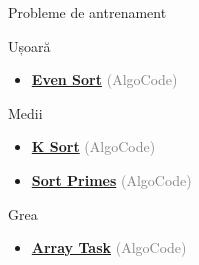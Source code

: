﻿\documentclass{beamer}
\begin{document}
\begin{frame}{Probleme de antrenament}
  \begin{block}{Ușoară}
    \begin{itemize}
      \item \href{https://code.algolymp.com/problems/1081}{\textbf{Even Sort}} {\footnotesize\textcolor{gray}{(AlgoCode)}}
    \end{itemize}
  \end{block}
  \begin{block}{Medii}
    \begin{itemize}
      \item \href{https://code.algolymp.com/problems/1077}{\textbf{K Sort}} {\footnotesize\textcolor{gray}{(AlgoCode)}}
      \item \href{https://code.algolymp.com/problems/1076}{\textbf{Sort Primes}} {\footnotesize\textcolor{gray}{(AlgoCode)}}
    \end{itemize}
  \end{block}
  \begin{block}{Grea}
    \begin{itemize}
      \item \href{https://code.algolymp.com/problems/1082}{\textbf{Array Task}} {\footnotesize\textcolor{gray}{(AlgoCode)}}
    \end{itemize}
  \end{block}
\end{frame}
\end{document}
